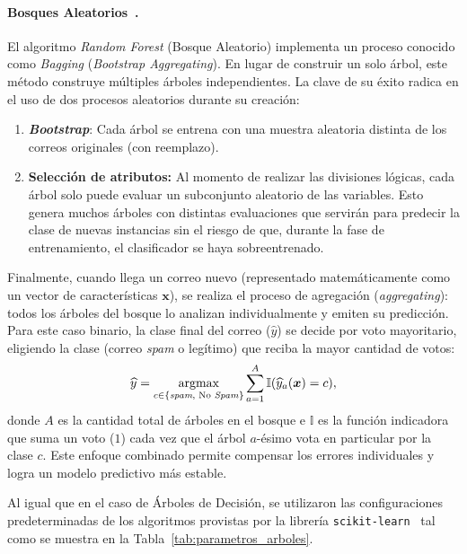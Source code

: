 \documentclass[a4paper,11pt ,openany]{book}
\begin{document}
\paragraph{Bosques Aleatorios~\cite{breiman2001random}.} {
El algoritmo \textit{Random Forest} (Bosque Aleatorio) implementa un proceso conocido como \textit{Bagging} (\textit{Bootstrap Aggregating}). En lugar de construir un solo árbol, este método construye múltiples árboles independientes. La clave de su éxito radica en el uso de dos procesos aleatorios durante su creación:
\begin{enumerate}
    \item \textbf{\emph{Bootstrap}}: Cada árbol se entrena con una muestra aleatoria distinta de los correos originales (con reemplazo).
    \item \textbf{Selección de atributos:} Al momento de realizar las divisiones lógicas, cada árbol solo puede evaluar un subconjunto aleatorio de las variables. Esto genera muchos árboles con distintas evaluaciones que servirán para predecir la clase de nuevas instancias sin el riesgo de que, durante la fase de entrenamiento, el clasificador se haya sobreentrenado.
\end{enumerate}

Finalmente, cuando llega un correo nuevo (representado matemáticamente como un vector de características $\boldsymbol{x}$), se realiza el proceso de agregación (\emph{aggregating}): todos los árboles del bosque lo analizan individualmente y emiten su predicción. Para este caso binario, la clase final del correo ($\widehat{y}$) se decide por voto mayoritario, eligiendo la clase (correo \textit{spam} o legítimo) que reciba la mayor cantidad de votos:
\begin{equation}
\widehat{y} = \underset{c \in \{\text{\textit{spam}, \text{No \textit{Spam}}}\}}{\textrm{argmax}} \sum_{a=1}^{A} \mathbb{I}(\widehat{y}_a(\boldsymbol{x}) = c)
\label{eq:rf_voting},
\end{equation}
donde $A$ es la cantidad total de árboles en el bosque e $\mathbb{I}$ es la función indicadora que suma un voto ($1$) cada vez que el árbol $a$-ésimo vota en particular por la clase $c$. Este enfoque combinado permite compensar los errores individuales y logra un modelo predictivo más estable.

Al igual que en el caso de Árboles de Decisión, se utilizaron las configuraciones predeterminadas de los algoritmos provistas por la librería \texttt{scikit-learn}~\cite{pedregosa2011scikit} tal como se muestra en la Tabla~\ref{tab:parametros_arboles}.}
\end{document}
